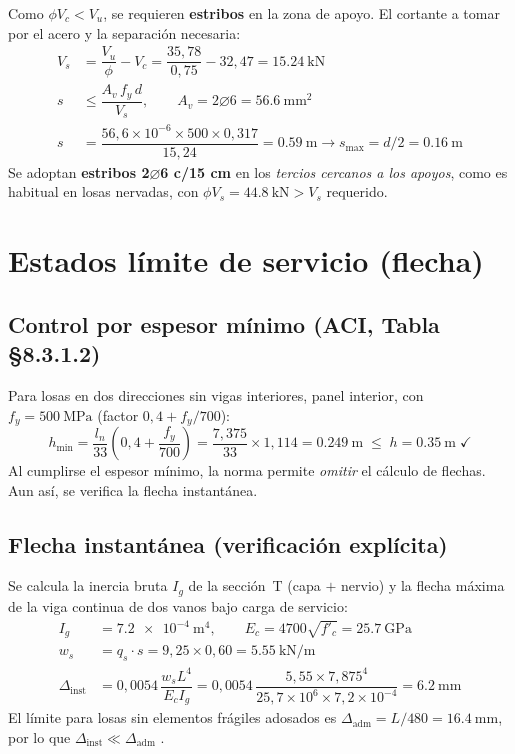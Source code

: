 Como $\phi V_c < V_u$, se requieren \textbf{estribos} en la zona de
apoyo. El cortante a tomar por el acero y la separación necesaria:
\begin{align}
  V_s &= \dfrac{V_u}{\phi} - V_c = \dfrac{35{,}78}{0{,}75} - 32{,}47
       = \SI{15,24}{\kilo\newton}\\
  s &\leq \dfrac{A_v\, f_y\, d}{V_s},\qquad
  A_v = 2\varnothing6 = \SI{56,6}{\milli\meter^2}\\
  s &= \dfrac{56{,}6\times 10^{-6} \times 500 \times 0{,}317}{15{,}24}
     = \SI{0,59}{\meter} \rightarrow
  s_{\max} = d/2 = \SI{0,16}{\meter}
\end{align}
Se adoptan \textbf{estribos 2$\varnothing$6 c/15 cm} en los
\emph{tercios cercanos a los apoyos}, como es habitual en losas
nervadas, con $\phi V_s = \SI{44,8}{\kilo\newton} > V_s$ requerido.

\section{Estados límite de servicio (flecha)}
\label{sec:els}

\subsection{Control por espesor mínimo (ACI, Tabla \S8.3.1.2)}
Para losas en dos direcciones sin vigas interiores, panel interior, con
$f_y = \SI{500}{\mega\pascal}$ (factor $0{,}4 + f_y/700$):
\begin{equation}
  h_{\min} = \dfrac{l_n}{33}\left(0{,}4 + \dfrac{f_y}{700}\right)
  = \dfrac{7{,}375}{33} \times 1{,}114 = \SI{0,249}{\meter}
  \;\leq\; h = \SI{0,35}{\meter} \;\checkmark
\end{equation}
Al cumplirse el espesor mínimo, la norma permite \emph{omitir} el
cálculo de flechas. Aun así, se verifica la flecha instantánea.

\subsection{Flecha instantánea (verificación explícita)}
Se calcula la inercia bruta $I_g$ de la sección~T (capa $+$ nervio) y la
flecha máxima de la viga continua de dos vanos bajo carga de servicio:
\begin{align}
  I_g &= \SI{7,2e-4}{\meter^4},\qquad
  E_c = 4700\sqrt{f'_c} = \SI{25,7}{\giga\pascal}\\
  w_s &= q_s \cdot s = 9{,}25 \times 0{,}60 = \SI{5,55}{\kilo\newton\per\meter}\\
  \Delta_{\text{inst}} &= 0{,}0054\,\dfrac{w_s L^4}{E_c I_g}
       = 0{,}0054\,\dfrac{5{,}55 \times 7{,}875^4}{25{,}7\times 10^6
         \times 7{,}2\times 10^{-4}} = \SI{6,2}{\milli\meter}
\end{align}
El límite para losas sin elementos frágiles adosados es
$\Delta_{\text{adm}} = L/480 = \SI{16,4}{\milli\meter}$, por lo que
$\Delta_{\text{inst}} \ll \Delta_{\text{adm}}$ \;\checkmark.

